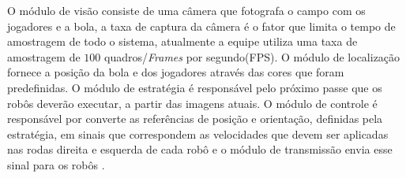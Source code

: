 O módulo de visão consiste de uma câmera que fotografa o campo com os jogadores e a bola, a taxa de captura da câmera é o fator que limita o tempo de amostragem de todo o sistema, atualmente a equipe utiliza uma taxa de amostragem de $100$ quadros/\emph{Frames} por segundo(FPS). O módulo de localização fornece a posição da bola e dos jogadores através das cores que foram predefinidas. O módulo de estratégia é responsável pelo próximo passe que os robôs deverão executar, a partir das imagens atuais. O módulo de controle é responsável por converte as referências de posição e orientação, definidas pela estratégia, em sinais que correspondem as velocidades que devem ser aplicadas nas rodas direita e esquerda de cada robô e o módulo de transmissão envia esse sinal para os robôs \cite{POTI}.\\




